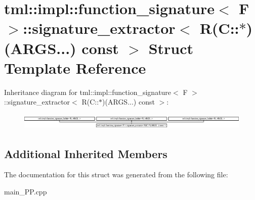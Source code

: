 \hypertarget{structtml_1_1impl_1_1function__signature_1_1signature__extractor_3_01R_07C_1_1_5_08_07ARGS_8_8_8_08_01const_01_01_4}{\section{tml\+:\+:impl\+:\+:function\+\_\+signature$<$ F $>$\+:\+:signature\+\_\+extractor$<$ R(C\+:\+:$\ast$)(A\+R\+G\+S...) const $>$ Struct Template Reference}
\label{structtml_1_1impl_1_1function__signature_1_1signature__extractor_3_01R_07C_1_1_5_08_07ARGS_8_8_8_08_01const_01_01_4}
}
Inheritance diagram for tml\+:\+:impl\+:\+:function\+\_\+signature$<$ F $>$\+:\+:signature\+\_\+extractor$<$ R(C\+:\+:$\ast$)(A\+R\+G\+S...) const $>$\+:\begin{figure}[H]
\begin{center}
\leavevmode
\includegraphics[height=0.784314cm]{structtml_1_1impl_1_1function__signature_1_1signature__extractor_3_01R_07C_1_1_5_08_07ARGS_8_8_8_08_01const_01_01_4}
\end{center}
\end{figure}
\subsection*{Additional Inherited Members}


The documentation for this struct was generated from the following file\+:\begin{DoxyCompactItemize}
\item 
main\+\_\+\+P\+P.\+cpp\end{DoxyCompactItemize}
